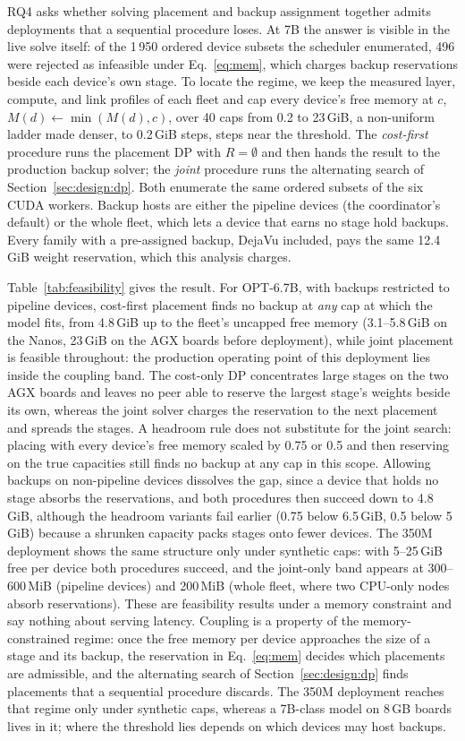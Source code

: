 RQ4 asks whether solving placement and backup assignment together admits
deployments that a sequential procedure loses.  At 7B the answer is visible
in the live solve itself: of the 1\,950 ordered device subsets the scheduler
enumerated, 496 were rejected as infeasible under Eq.~\ref{eq:mem}, which charges
backup reservations beside each device's own stage.  To locate the
regime, we keep the measured layer, compute, and link profiles of each fleet
and cap every device's free memory at $c$, $M(d)\leftarrow\min(M(d),c)$,
over 40 caps from 0.2 to 23\,GiB, a non-uniform ladder made denser, to 0.2\,GiB steps,
steps near the threshold.  The \emph{cost-first} procedure
runs the placement DP with $R=\emptyset$ and then hands the result to the
production backup solver; the \emph{joint} procedure runs the alternating
search of Section~\ref{sec:design:dp}.  Both enumerate the same ordered
subsets of the six CUDA workers.  Backup hosts are either the pipeline devices
(the coordinator's default) or the whole fleet, which lets a device that
earns no stage hold backups.  Every family with a pre-assigned backup,
DejaVu included, pays the same 12.4\,GiB weight reservation, which this
analysis charges.

Table~\ref{tab:feasibility} gives the result.  For OPT-6.7B, with backups
restricted to pipeline devices, cost-first placement finds no backup at
\emph{any} cap at which the model fits, from 4.8\,GiB up to the fleet's
uncapped free memory (3.1--5.8\,GiB on the Nanos, 23\,GiB on the AGX boards
before deployment), while joint placement is feasible throughout: the
production operating point of this deployment lies inside the coupling
band.  The cost-only DP concentrates large stages on the two AGX boards and
leaves no peer able to reserve the largest stage's weights beside its own,
whereas the joint solver charges the reservation to the next placement and
spreads the stages.  A headroom rule does not substitute for the joint
search: placing with every device's free memory scaled by 0.75 or 0.5 and
then reserving on the true capacities still finds no backup at any cap in
this scope.  Allowing backups on non-pipeline devices dissolves the gap,
since a device that holds no stage absorbs the reservations, and both
procedures then succeed down to 4.8\,GiB, although the headroom variants
fail earlier (0.75 below 6.5\,GiB, 0.5 below 5\,GiB) because a shrunken
capacity packs stages onto fewer devices.  The 350M deployment shows the
same structure only under synthetic caps: with 5--25\,GiB free per device
both procedures succeed, and the joint-only band appears at 300--600\,MiB
(pipeline devices) and 200\,MiB (whole fleet, where two CPU-only nodes absorb
reservations).
These are feasibility results under a memory constraint and say nothing
about serving latency.  Coupling is a property of the memory-constrained
regime: once the free memory per device approaches the size of a stage and
its backup, the reservation in Eq.~\ref{eq:mem} decides which placements are
admissible, and the alternating search of Section~\ref{sec:design:dp} finds
placements that a sequential procedure discards.  The 350M deployment
reaches that regime only under synthetic caps, whereas a 7B-class model on
8\,GB boards lives in it; where the threshold lies depends on which devices
may host backups.

